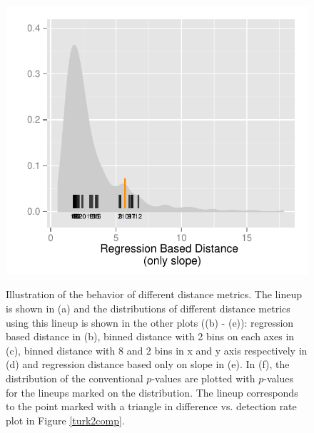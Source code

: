 \documentclass[12]{article}
\begin{document}
\begin{figure}[hbtp]
{\includegraphics[scale=0.55]{distribution-reg-no-int-dist-exp2.pdf}
\label{t2comp_1}
}
	\vspace{-.1in}
\caption[Optional caption for list of figures]{Illustration of the behavior of different distance metrics. The lineup is shown in (a) and the distributions of different distance metrics using this lineup is shown in the other plots ((b) - (e)): regression based distance in (b), binned distance with 2 bins on each axes in (c), binned distance with 8 and 2 bins in x and y axis respectively in (d) and regression distance based only on slope in (e). In (f), the distribution of the conventional $p$-values are plotted with $p$-values for the lineups marked on the distribution. The lineup corresponds to the point marked with a triangle in difference vs. detection rate plot in Figure \ref{turk2comp}.}
\label{turk2-exp}
\end{figure}
\end{document}

